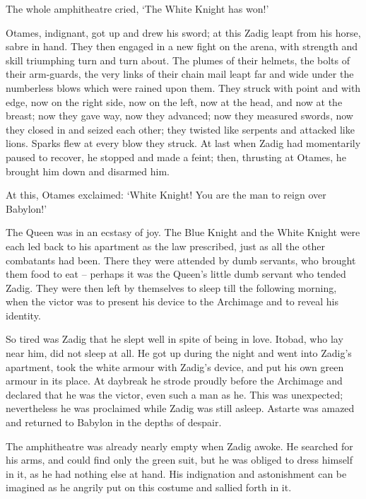 \documentclass{article}
\begin{document}
\begin{center}
The whole amphitheatre cried, `The White Knight has won!' 

Otames, indignant, got up and drew his sword; at this Zadig leapt from his horse, 
sabre in hand. They then engaged in a new fight on the arena, with strength and 
skill triumphing turn and turn about. The plumes of their helmets, the bolts of 
their arm-guards, the very links of their chain mail leapt far and wide under the 
numberless blows which were rained upon them. They struck with point and with edge, 
now on the right side, now on the left, now at the head, and now at the breast; 
now they gave way, now they advanced; now they measured swords, now they closed 
in and seized each other; they twisted like serpents and attacked like lions. Sparks 
flew at every blow they struck. At last when Zadig had momentarily paused to recover, 
he stopped and made a feint; then, thrusting at Otames, he brought him down and 
disarmed him. 

At this, Otames exclaimed: `White Knight! You are the man to reign over Babylon!' 

The Queen was in an ecstasy of joy. The Blue Knight and the White Knight were each 
led back to his apartment as the law prescribed, just as all the other combatants 
had been. There they were attended by dumb servants, who brought them food to eat 
– perhaps it was the Queen's little dumb servant who tended Zadig. They were 
then left by themselves to sleep till the following morning, when the victor was 
to present his device to the Archimage and to reveal his identity. 

So tired was Zadig that he slept well in spite of being in love. Itobad, who lay 
near him, did not sleep at all. He got up during the night and went into Zadig's 
apartment, took the white armour with Zadig's device, and put his own green armour 
in its place. At daybreak he strode proudly before the Archimage and declared that 
he was the victor, even such a man as he. This was unexpected; nevertheless he 
was proclaimed while Zadig was still asleep. Astarte was amazed and returned to 
Babylon in the depths of despair. 

The amphitheatre was already nearly empty when Zadig awoke. He searched for his 
arms, and could find only the green suit, but he was obliged to dress himself in 
it, as he had nothing else at hand. His indignation and astonishment can be imagined 
as he angrily put on this costume and sallied forth in it. 


\end{center}
\end{document}
